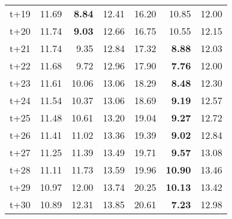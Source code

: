 \begin{table}[H]
\begin{tabular}{lrrrrrr}
t+19  & 11.69  & \textbf{8.84}  & 12.41  & 16.20  & 10.85  & 12.00  \\
t+20  & 11.74  & \textbf{9.03}  & 12.66  & 16.75  & 10.55  & 12.15  \\
t+21  & 11.74  & 9.35  & 12.84  & 17.32  & \textbf{8.88}  & 12.03  \\
t+22  & 11.68  & 9.72  & 12.96  & 17.90  & \textbf{7.76}  & 12.00  \\
t+23  & 11.61  & 10.06  & 13.06  & 18.29  & \textbf{8.48}  & 12.30  \\
t+24  & 11.54  & 10.37  & 13.06  & 18.69  & \textbf{9.19}  & 12.57  \\
t+25  & 11.48  & 10.61  & 13.20  & 19.04  & \textbf{9.27}  & 12.72  \\
t+26  & 11.41  & 11.02  & 13.36  & 19.39  & \textbf{9.02}  & 12.84  \\
t+27  & 11.25  & 11.39  & 13.49  & 19.71  & \textbf{9.57}  & 13.08  \\
t+28  & 11.11  & 11.73  & 13.59  & 19.96  & \textbf{10.90}  & 13.46  \\
t+29  & 10.97  & 12.00  & 13.74  & 20.25  & \textbf{10.13}  & 13.42  \\
t+30  & 10.89  & 12.31  & 13.85  & 20.61  & \textbf{7.23}  & 12.98  \\

\bottomrule
\end{tabular}
\end{table}
